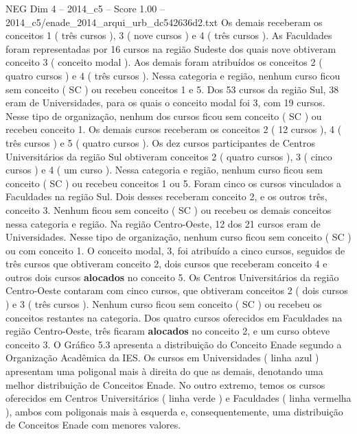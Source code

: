 \begin{textsample}{NEG Dim 4 – 2014\_c5 – Score 1.00 – 2014\_c5/enade\_2014\_arqui\_urb\_dc542636d2.txt}
Os demais receberam os conceitos 1 ( três cursos ), 3 ( nove cursos ) e 4 ( três cursos ).
As Faculdades foram representadas por 16 cursos na região Sudeste dos quais nove obtiveram conceito 3 ( conceito modal ).
Aos demais foram atribuídos os conceitos 2 ( quatro cursos ) e 4 ( três cursos ).
Nessa categoria e região, nenhum curso ficou sem conceito ( SC ) ou recebeu conceitos 1 e 5.
Dos 53 cursos da região Sul, 38 eram de Universidades, para os quais o conceito modal foi 3, com 19 cursos.
Nesse tipo de organização, nenhum dos cursos ficou sem conceito ( SC ) ou recebeu conceito 1.
Os demais cursos receberam os conceitos 2 ( 12 cursos ), 4 ( três cursos ) e 5 ( quatro cursos ).
Os dez cursos participantes de Centros Universitários da região Sul obtiveram conceitos 2 ( quatro cursos ), 3 ( cinco cursos ) e 4 ( um curso ).
Nessa categoria e região, nenhum curso ficou sem conceito ( SC ) ou recebeu conceitos 1 ou 5.
Foram cinco os cursos vinculados a Faculdades na região Sul.
Dois desses receberam conceito 2, e os outros três, conceito 3.
Nenhum ficou sem conceito ( SC ) ou recebeu os demais conceitos nessa categoria e região.
Na região Centro-Oeste, 12 dos 21 cursos eram de Universidades.
Nesse tipo de organização, nenhum curso ficou sem conceito ( SC ) ou com conceito 1.
O conceito modal, 3, foi atribuído a cinco cursos, seguidos de três cursos que obtiveram conceito 2, dois cursos que receberam conceito 4 e outros dois cursos \textbf{alocados} no conceito 5.
Os Centros Universitários da região Centro-Oeste contaram com cinco cursos, que obtiveram conceitos 2 ( dois cursos ) e 3 ( três cursos ).
Nenhum curso ficou sem conceito ( SC ) ou recebeu os conceitos restantes na categoria.
Dos quatro cursos oferecidos em Faculdades na região Centro-Oeste, três ficaram \textbf{alocados} no conceito 2, e um curso obteve conceito 3.
O Gráfico 5.3 apresenta a distribuição do Conceito Enade segundo a Organização Acadêmica da IES.
Os cursos em Universidades ( linha azul ) apresentam uma poligonal mais à direita do que as demais, denotando uma melhor distribuição de Conceitos Enade.
No outro extremo, temos os cursos oferecidos em Centros Universitários ( linha verde ) e Faculdades ( linha vermelha ), ambos com poligonais mais à esquerda e, consequentemente, uma distribuição de Conceitos Enade com menores valores.

\end{textsample}
